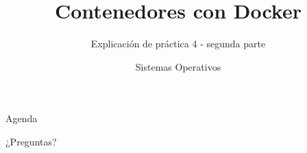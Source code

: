 


\title{Contenedores con Docker}
\author{Sistemas Operativos}
\subtitle{Explicación de práctica 4 - segunda parte}



\begin{frame}
  \titlepage
\end{frame}

\begin{frame}{Agenda}
  \tableofcontents
\end{frame}



\begin{frame}{}
  \begin{center}
    \vfill
    \huge ¿Preguntas?
    \vfill
  \end{center}
\end{frame}


